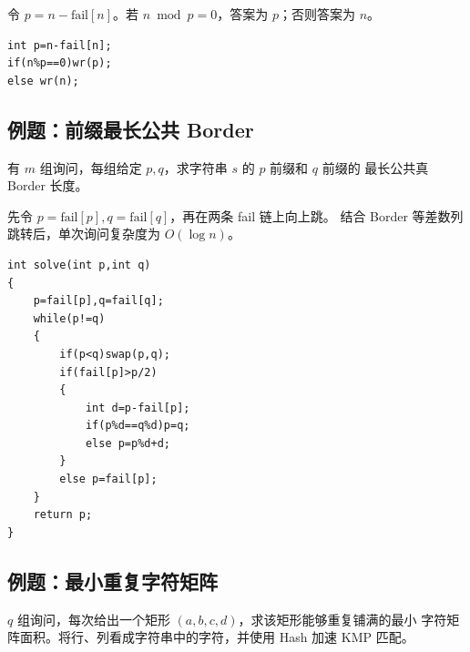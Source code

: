 令 $p=n-\mathrm{fail}[n]$。若 $n\bmod p=0$，答案为 $p$；否则答案为 $n$。

\begin{verbatim}
int p=n-fail[n];
if(n%p==0)wr(p);
else wr(n);
\end{verbatim}

\subsection{例题：前缀最长公共 Border}

\begin{tcolorbox}
有 $m$ 组询问，每组给定 $p,q$，求字符串 $s$ 的 $p$ 前缀和 $q$ 前缀的
最长公共真 Border 长度。
\end{tcolorbox}

先令 $p=\mathrm{fail}[p],q=\mathrm{fail}[q]$，再在两条 fail 链上向上跳。
结合 Border 等差数列跳转后，单次询问复杂度为 $O(\log n)$。

\begin{verbatim}
int solve(int p,int q)
{
    p=fail[p],q=fail[q];
    while(p!=q)
    {
        if(p<q)swap(p,q);
        if(fail[p]>p/2)
        {
            int d=p-fail[p];
            if(p%d==q%d)p=q;
            else p=p%d+d;
        }
        else p=fail[p];
    }
    return p;
}
\end{verbatim}

\subsection{例题：最小重复字符矩阵}

\begin{tcolorbox}
$q$ 组询问，每次给出一个矩形 $(a,b,c,d)$，求该矩形能够重复铺满的最小
字符矩阵面积。将行、列看成字符串中的字符，并使用 Hash 加速 KMP 匹配。
\end{tcolorbox}

